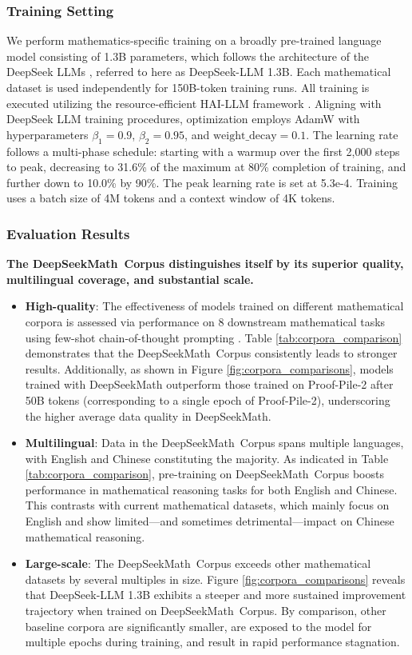 \subsubsection{Training Setting}
\label{sec:quality-policy}
We perform mathematics-specific training on a broadly pre-trained language model consisting of 1.3B parameters, which follows the architecture of the DeepSeek LLMs \citep{deepseek-llm}, referred to here as DeepSeek-LLM 1.3B. Each mathematical dataset is used independently for 150B-token training runs. All training is executed utilizing the resource-efficient HAI-LLM framework \citep{haillm}. Aligning with DeepSeek LLM training procedures, optimization employs AdamW \citep{adamW} with hyperparameters $\beta_1=0.9$, $\beta_2=0.95$, and $\mathrm{weight\_decay}=0.1$. The learning rate follows a multi-phase schedule: starting with a warmup over the first 2,000 steps to peak, decreasing to 31.6\% of the maximum at 80\% completion of training, and further down to 10.0\% by 90\%. The peak learning rate is set at 5.3e-4. Training uses a batch size of 4M tokens and a context window of 4K tokens.

\subsubsection{Evaluation Results}

\textbf{The DeepSeekMath~Corpus distinguishes itself by its superior quality, multilingual coverage, and substantial scale.}

\begin{itemize}[topsep=0pt]
    \item \textbf{High-quality}: 
    The effectiveness of models trained on different mathematical corpora is assessed via performance on 8 downstream mathematical tasks using few-shot chain-of-thought prompting \cite{cot}. Table \ref{tab:corpora_comparison} demonstrates that the DeepSeekMath~Corpus consistently leads to stronger results. Additionally, as shown in Figure \ref{fig:corpora_comparisons}, models trained with DeepSeekMath outperform those trained on Proof-Pile-2 after 50B tokens (corresponding to a single epoch of Proof-Pile-2), underscoring the higher average data quality in DeepSeekMath.
    \item \textbf{Multilingual}:
    Data in the DeepSeekMath~Corpus spans multiple languages, with English and Chinese constituting the majority. As indicated in Table \ref{tab:corpora_comparison}, pre-training on DeepSeekMath~Corpus boosts performance in mathematical reasoning tasks for both English and Chinese. This contrasts with current mathematical datasets, which mainly focus on English and show limited—and sometimes detrimental—impact on Chinese mathematical reasoning.
    \item \textbf{Large-scale}:
    The DeepSeekMath~Corpus exceeds other mathematical datasets by several multiples in size. Figure \ref{fig:corpora_comparisons} reveals that DeepSeek-LLM 1.3B exhibits a steeper and more sustained improvement trajectory when trained on DeepSeekMath~Corpus. By comparison, other baseline corpora are significantly smaller, are exposed to the model for multiple epochs during training, and result in rapid performance stagnation.
\end{itemize}

